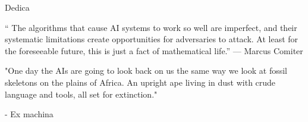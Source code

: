 
\cleardoublepage
{}
\thispagestyle{empty}

\vspace*{3cm}


\medskip

\begin{center}
Dedica
\end{center}

“ The algorithms
that cause AI systems
to work so well are
imperfect, and their
systematic limitations
create opportunities for
adversaries to attack. At
least for the foreseeable
future, this is just a fact of
mathematical life.”
 --- Marcus Comiter


 "One day the AIs are going to look back on us the same way we look at fossil skeletons on the plains of Africa. An upright ape living in dust with crude language and tools, all set for extinction."

- Ex machina